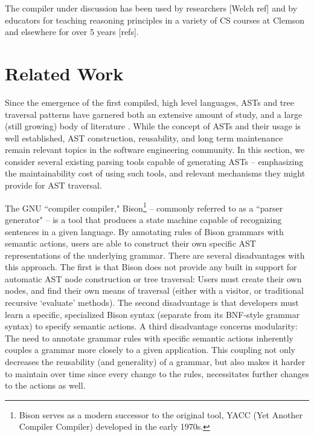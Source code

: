 \documentclass[times]{speauth}
\begin{document}
The compiler under discussion has been used by researchers [Welch ref] and by educators for teaching reasoning principles in a variety of CS courses at Clemson and elsewhere for over 5 years [refs].

\vspace{-6pt}


\section{Related Work}
\vspace{-2pt}

Since the emergence of the first compiled, high level languages, ASTs and tree traversal patterns have garnered both an extensive amount of study, and a large (still growing) body of literature \cite{tanumoy:2012}. While the concept of ASTs and their usage is well established, AST construction, reusability, and long term maintenance remain relevant topics in the software engineering community. In this section, we consider several existing parsing tools capable of generating ASTs -- emphasizing the maintainability cost of using such tools, and relevant mechanisms they might provide for AST traversal.

The GNU ``compiler compiler," Bison\footnote{Bison serves as a modern successor to the original tool, YACC (Yet Another Compiler Compiler) developed in the early 1970s.} \cite{levine:1992} -- commonly referred to as a ``parser generator" -- is a tool that produces a state machine capable of recognizing sentences in a given language. By annotating rules of Bison grammars with semantic actions, users are able to construct their own specific AST representations of the underlying grammar. There are several disadvantages with this approach. The first is that Bison does not provide any built in support for automatic AST node construction or tree traversal: Users must create their own nodes, and find their own means of traversal (either with a visitor, or traditional recursive `evaluate' methods). The second disadvantage is that developers must learn a specific, specialized Bison syntax (separate from its BNF-style grammar syntax) to specify semantic actions. A third disadvantage concerns modularity: The need to annotate grammar rules with specific semantic actions inherently couples a grammar more closely to a given application. This coupling not only decreases the reusability (and generality) of a grammar, but also makes it harder to maintain over time since every change to the rules, necessitates further changes to the actions as well.
\end{document}
